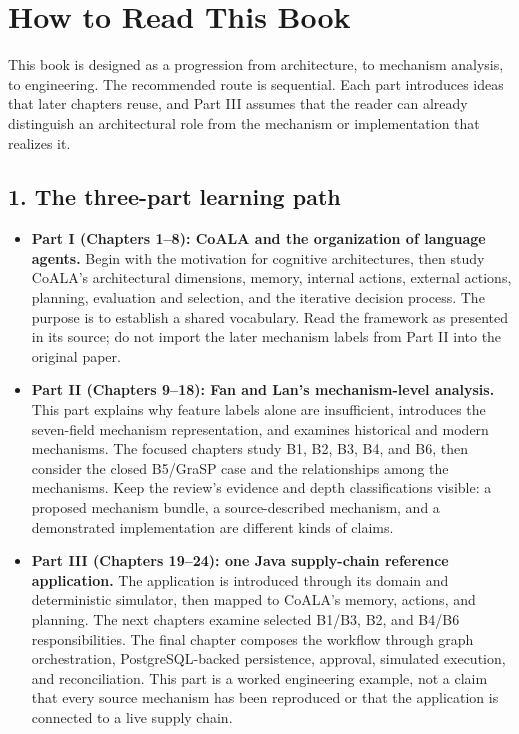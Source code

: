 \chapter*{How to Read This Book}

This book is designed as a progression from architecture, to mechanism analysis, to engineering. The recommended route is sequential. Each part introduces ideas that later chapters reuse, and Part III assumes that the reader can already distinguish an architectural role from the mechanism or implementation that realizes it.

\section*{1. The three-part learning path}

\begin{itemize}
  \item \textbf{Part I (Chapters 1--8): CoALA and the organization of language agents.} Begin with the motivation for cognitive architectures, then study CoALA's architectural dimensions, memory, internal actions, external actions, planning, evaluation and selection, and the iterative decision process. The purpose is to establish a shared vocabulary. Read the framework as presented in its source; do not import the later mechanism labels from Part II into the original paper.
  \item \textbf{Part II (Chapters 9--18): Fan and Lan's mechanism-level analysis.} This part explains why feature labels alone are insufficient, introduces the seven-field mechanism representation, and examines historical and modern mechanisms. The focused chapters study B1, B2, B3, B4, and B6, then consider the closed B5/GraSP case and the relationships among the mechanisms. Keep the review's evidence and depth classifications visible: a proposed mechanism bundle, a source-described mechanism, and a demonstrated implementation are different kinds of claims.
  \item \textbf{Part III (Chapters 19--24): one Java supply-chain reference application.} The application is introduced through its domain and deterministic simulator, then mapped to CoALA's memory, actions, and planning. The next chapters examine selected B1/B3, B2, and B4/B6 responsibilities. The final chapter composes the workflow through graph orchestration, PostgreSQL-backed persistence, approval, simulated execution, and reconciliation. This part is a worked engineering example, not a claim that every source mechanism has been reproduced or that the application is connected to a live supply chain.
\end{itemize}

